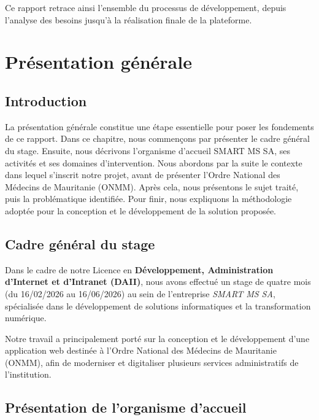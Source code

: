 ﻿\documentclass[12pt,a4paper]{report}
\begin{document}
Ce rapport retrace ainsi l'ensemble du processus de développement, depuis
l'analyse des besoins jusqu'à la réalisation finale de la plateforme.




\chapter{Présentation générale}   



\section{Introduction}
La présentation générale constitue une étape essentielle pour poser les fondements de ce rapport. Dans ce chapitre, nous commençons par présenter le cadre général du stage. Ensuite, nous décrivons l’organisme d’accueil SMART MS SA, ses activités et ses domaines d’intervention. Nous abordons par la suite le contexte dans lequel s’inscrit notre projet, avant de présenter l’Ordre National des Médecins de Mauritanie (ONMM). Après cela, nous présentons le sujet traité, puis la problématique identifiée. Pour finir, nous expliquons la méthodologie adoptée pour la conception et le développement de la solution proposée.

\section{Cadre général du stage}

Dans le cadre de notre Licence en \textbf{Développement, Administration
d’Internet et d’Intranet (DAII)}, nous avons effectué un stage de
quatre mois (du 16/02/2026 au 16/06/2026) au sein de l’entreprise
\textit{SMART MS SA}, spécialisée dans le développement de solutions
informatiques et la transformation numérique.

Notre travail a principalement porté sur la conception et le
développement d’une application web destinée à l’Ordre National des
Médecins de Mauritanie (ONMM), afin de moderniser et digitaliser
plusieurs services administratifs de l’institution.

\section{Présentation de l’organisme d’accueil}
\label{sec:smartmssa}
\end{document}

